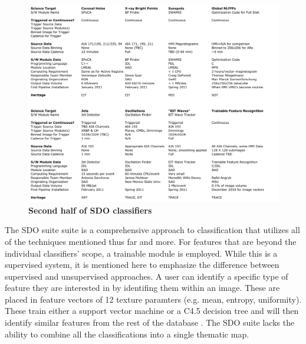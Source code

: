 \documentclass[twoside]{report}
\begin{document}
\begin{figure}[ht]
  \begin{center}
    \includegraphics[scale=0.5]{sdo2.png}
    \caption{{\bf Second half of SDO classifiers} \cite{sdo}}
    \label{fig:sdo2}
 \end{center}
\end{figure}

The SDO suite suite is a comprehensive approach to classification that utilizes all of the techniques mentioned thus far and more. For features that are beyond the individual classifiers' scope, a trainable module is employed. While this is a supervised system, it is mentioned here to emphasize the difference between supervised and unsupervised approaches. A user can identify a specific type of feature they are interested in by identifing them within an image. These are placed in feature vectors of 12 texture paramters (e.g. mean, entropy, uniformity). These train either a support vector machine or a C4.5 decision tree and will then identify similar features from the rest of the database \cite{lamb2008example}. The SDO suite lacks the ability to combine all the classifications into a single thematic map. 
\end{document}
